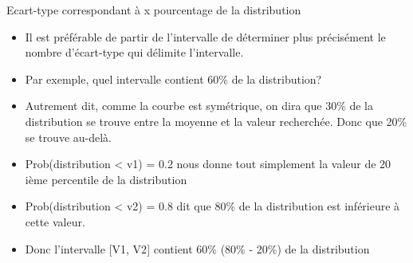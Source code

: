 \documentclass[
  ignorenonframetext,
]{beamer}
\providecommand{\tightlist}{%
  \setlength{\itemsep}{0pt}\setlength{\parskip}{0pt}}
\begin{document}
\begin{frame}{Ecart-type correspondant à x pourcentage de la
distribution}
\protect\hypertarget{ecart-type-correspondant-uxe0-x-pourcentage-de-la-distribution}{}
\begin{itemize}
\tightlist
\item
  Il est préférable de partir de l'intervalle de déterminer plus
  précisément le nombre d'écart-type qui délimite l'intervalle.
\end{itemize}

\begin{itemize}[<+->]
\tightlist
\item
  Par exemple, quel intervalle contient 60\% de la distribution?
\end{itemize}

\begin{itemize}[<+->]
\tightlist
\item
  Autrement dit, comme la courbe est symétrique, on dira que 30\% de la
  distribution se trouve entre la moyenne et la valeur recherchée. Donc
  que 20\% se trouve au-delà.
\end{itemize}

\begin{itemize}[<+->]
\tightlist
\item
  Prob(distribution \textless{} v1) = 0.2 nous donne tout simplement la
  valeur de 20 ième percentile de la distribution
\end{itemize}

\begin{itemize}[<+->]
\tightlist
\item
  Prob(distribution \textless{} v2) = 0.8 dit que 80\% de la
  distribution est inférieure à cette valeur.
\end{itemize}

\begin{itemize}[<+->]
\tightlist
\item
  Donc l'intervalle {[}V1, V2{]} contient 60\% (80\% - 20\%) de la
  distribution
\end{itemize}
\end{frame}
\end{document}
